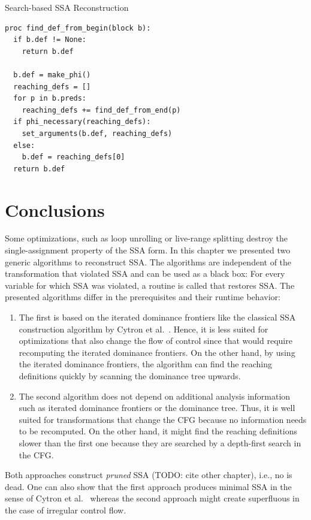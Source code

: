 \begin{algorithm}
	\caption{Search-based SSA Reconstruction}
	\label{alg:ssaconstr_click}

\begin{verbatim}
proc find_def_from_begin(block b):
  if b.def != None:
    return b.def

  b.def = make_phi()
  reaching_defs = []
  for p in b.preds:
    reaching_defs += find_def_from_end(p)
  if phi_necessary(reaching_defs):
    set_arguments(b.def, reaching_defs)
  else:
    b.def = reaching_defs[0]
  return b.def
\end{verbatim}
\end{algorithm}

\section{Conclusions}

Some optimizations, such as loop unrolling or live-range splitting destroy the single-assignment property of the SSA form.
In this chapter we presented two generic algorithms to reconstruct SSA.
The algorithms are independent of the transformation that violated SSA and can be used as a black box:
For every variable for which SSA was violated, a routine is called that restores SSA.
The presented algorithms differ in the prerequisites and their runtime behavior:
\begin{enumerate}
	\item 
		The first is based on the iterated dominance frontiers like the classical SSA construction algorithm by Cytron et al.~\cite{cytron:1991:ssa}.
		Hence, it is less suited for optimizations that also change the flow of control since that would require recomputing the iterated dominance frontiers.
		On the other hand, by using the iterated dominance frontiers, the algorithm can find the reaching definitions quickly by scanning the dominance tree upwards.
	\item 
		The second algorithm does not depend on additional analysis information such as iterated dominance frontiers or the dominance tree.
		Thus, it is well suited for transformations that change the CFG because no information needs to be recomputed.
		On the other hand, it might find the reaching definitions slower than the first one because they are searched by a depth-first search in the CFG.
\end{enumerate}
Both approaches construct \emph{pruned} SSA (TODO: cite other chapter), i.e., no \phifun is dead. 
One can also show that the first approach produces minimal SSA in the sense of Cytron et al.~\cite{cytron:1991:ssa} whereas the second approach might create superfluous \phifuns in the case of irregular control flow.
